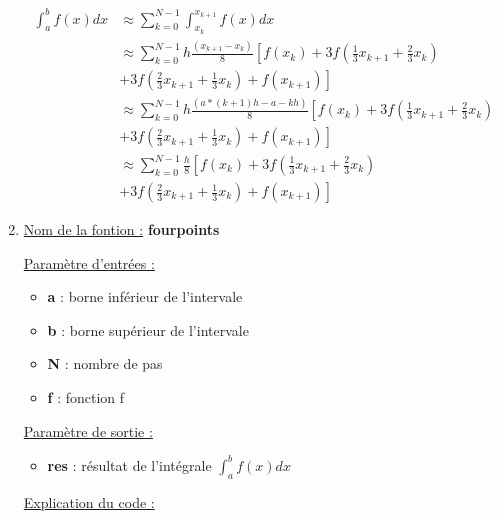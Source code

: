 \documentclass{article}
\begin{document}
\begin{enumerate}
  \begin{equation*}
    \begin{split}
      \int_a^b {f(x) dx} & \approx \sum_{k = 0}^{N - 1}{\int_{x_k}^{x_{k + 1}}{f(x) dx}} \\
      & \approx \sum_{k = 0}^{N - 1} h \frac{(x_{k + 1} - x_k)}{8} \left[ f(x_k) + 3
          f\left( \frac{1}{3} x_{k + 1} + \frac{2}{3} x_k \right)
          \right. \\
      & \left . + 3 f\left( \frac{2}{3} x_{k + 1} + \frac{1}{3} x_k
          \right) + f(x_{k + 1}) \right] \\
      & \approx \sum_{k = 0}^{N - 1} h \frac{(a * (k + 1)h - a - kh)}{8} \left[ f(x_k) + 3
          f\left( \frac{1}{3} x_{k + 1} + \frac{2}{3} x_k \right)
          \right. \\
      & \left . + 3 f\left( \frac{2}{3} x_{k + 1} + \frac{1}{3} x_k
          \right) + f(x_{k + 1}) \right] \\
      & \approx \sum_{k = 0}^{N - 1} \frac{h}{8} \left[ f(x_k) + 3
          f\left( \frac{1}{3} x_{k + 1} + \frac{2}{3} x_k \right)
          \right. \\
      & \left . + 3 f\left( \frac{2}{3} x_{k + 1} + \frac{1}{3} x_k
          \right) + f(x_{k + 1}) \right]
      \end{split}
  \end{equation*}

\item
  \underline{Nom de la fontion :} \textbf{fourpoints} \newline
  
  \underline{Paramètre d'entrées :}
  \begin{itemize}
  \item \textbf{a} : borne inférieur de l'intervale
  \item \textbf{b} : borne supérieur de l'intervale
  \item \textbf{N} : nombre de pas
  \item \textbf{f} : fonction f
  \end{itemize}

  \underline{Paramètre de sortie :}
  \begin{itemize}
  \item \textbf{res} : résultat de l'intégrale $\int_a^b {f(x) dx}$
  \end{itemize}

  \underline{Explication du code :} \newline
  

\end{enumerate}
\end{document}
